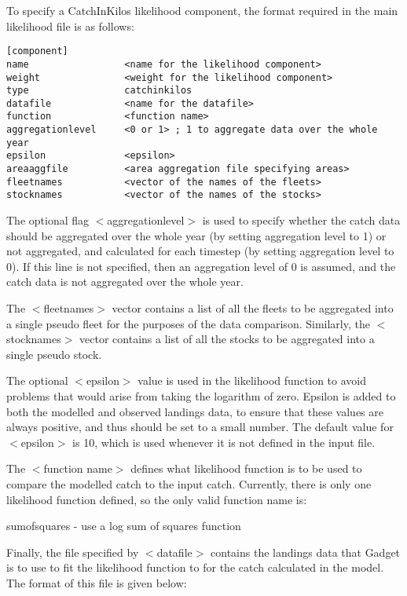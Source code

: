 \documentclass[10pt,twoside]{book}
\begin{document}
\bigskip
To specify a CatchInKilos likelihood component, the format required in the main likelihood file is as follows:

{\small\begin{verbatim}
[component]
name                 <name for the likelihood component>
weight               <weight for the likelihood component>
type                 catchinkilos
datafile             <name for the datafile>
function             <function name>
aggregationlevel     <0 or 1> ; 1 to aggregate data over the whole year
epsilon              <epsilon>
areaaggfile          <area aggregation file specifying areas>
fleetnames           <vector of the names of the fleets>
stocknames           <vector of the names of the stocks>
\end{verbatim}}

The optional flag $<$aggregationlevel$>$ is used to specify whether the catch data should be aggregated over the whole year (by setting aggregation level to 1) or not aggregated, and calculated for each timestep (by setting aggregation level to 0).  If this line is not specified, then an aggregation level of 0 is assumed, and the catch data is not aggregated over the whole year.

\bigskip
The $<$fleetnames$>$ vector contains a list of all the fleets to be aggregated into a single pseudo fleet for the purposes of the data comparison.  Similarly, the $<$stocknames$>$ vector contains a list of all the stocks to be aggregated into a single pseudo stock.

\bigskip
The optional $<$epsilon$>$ value is used in the likelihood function to avoid problems that would arise from taking the logarithm of zero.  Epsilon is added to both the modelled and observed landings data, to ensure that these values are always positive, and thus should be set to a small number.  The default value for $<$epsilon$>$ is 10, which is used whenever it is not defined in the input file.

\bigskip
The $<$function name$>$ defines what likelihood function is to be used to compare the modelled catch to the input catch.  Currently, there is only one likelihood function defined, so the only valid function name is:

\bigskip
sumofsquares - use a log sum of squares function

\bigskip
Finally, the file specified by $<$datafile$>$ contains the landings data that Gadget is to use to fit the likelihood function to for the catch calculated in the model.  The format of this file is given below:
\end{document}
